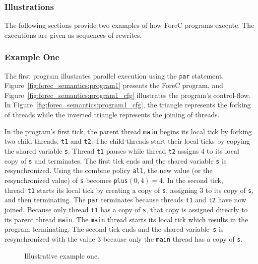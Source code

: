 \subsubsection{Illustrations}
The following sections provide two examples of how ForeC programs
execute. The executions are given as sequences of rewrites.

\subsubsection{Example One}
The first program illustrates parallel execution using
the \verb$par$ statement. Figure~\ref{fig:forec_semantics:program1}
presents the ForeC program, and Figure~\ref{fig:forec_semantics:program1_cfg}
illustrates the program's control-flow. 
In Figure~\ref{fig:forec_semantics:program1_cfg}, the triangle 
represents the forking of threads while the inverted triangle
represents the joining of threads. 

In the program's first 
tick, the parent thread \verb$main$ begins its local tick by
forking two child threads, \verb$t1$ and \verb$t2$. The child
threads start their local ticks by copying the shared variable
\verb$s$. Thread \verb$t1$ pauses while thread \verb$t2$ 
assigns $4$ to its local copy of \verb$s$ and terminates. The 
first tick ends and the shared variable \verb$s$ is resynchronized.
Using the combine policy \verb$all$, the new value (or the 
resynchronized value) of \verb$s$
becomes \verb$plus$$(0,4) = 4$.
In the second tick, thread~\verb$t1$ starts
its local tick by creating a copy of \verb$s$, assigning
$3$ to its copy of \verb$s$, and then terminating. The 
\verb$par$ terminates because threads \verb$t1$ and 
\verb$t2$ have now joined. Because only thread \verb$t1$ 
has a copy of \verb$s$, that copy is assigned directly to 
its parent thread \verb$main$. The \verb$main$ thread starts
its local tick which results in the program terminating.
The second tick ends and the shared variable~\verb$s$ is 
resynchronized with the value $3$
because only the \verb$main$ thread has a copy of \verb$s$.

\begin{figure}
	\centering

	\hfill
	\begin{minipage}{0.47\columnwidth}

	\end{minipage}
	\begin{minipage}{0.4\columnwidth}
	\end{minipage}
	\hspace{0.1cm}

	\caption{Illustrative example one.}
\end{figure}

